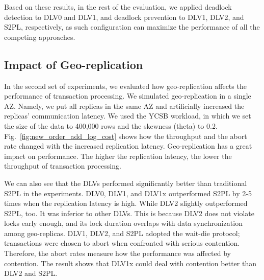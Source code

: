 \documentclass[conference]{IEEEtran}
\begin{document}
Based on these results, in the rest of the evaluation, we applied deadlock detection to DLV0 and DLV1, and deadlock prevention to DLV1, DLV2, and S2PL, respectively,
as such configuration can maximize the performance of all the competing approaches.


\subsection{Impact of Geo-replication}

In the second set of experiments, we evaluated how geo-replication affects the performance of transaction processing.
We simulated geo-replication in a single AZ.
Namely, we put all replicas in the same AZ and artificially increased the replicas' communication latency.
We used the YCSB workload, in which we set the size of the data to 400,000 rows and the skewness (theta) to 0.2.
Fig.~\ref{fig:new_order_add_log_cost} shows how the throughput and the abort rate changed with the increased replication latency.
Geo-replication has a great impact on performance. The higher the replication latency, the lower the throughput of transaction processing.

We can also see that the DLVs performed significantly better than traditional S2PL in the experiments.
DLV0, DLV1, and DLV1x outperformed S2PL by 2-5 times when the replication latency is high.
While DLV2 slightly outperformed S2PL, too. It was inferior to other DLVs.
This is because DLV2 does not violate locks early enough, and its lock duration overlaps with data synchronization among geo-replicas.
DLV1, DLV2, and S2PL adopted the wait-die protocol; transactions were chosen to abort when confronted with serious contention.
Therefore, the abort rates measure how the performance was affected by contention.
The result shows that DLV1x could deal with contention better than DLV2 and S2PL.
\end{document}
